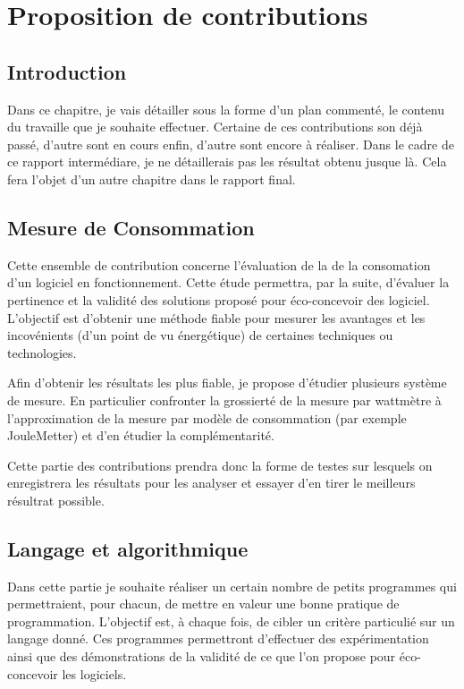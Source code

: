\documentclass[a4paper, 11pt]{report}
\begin{document}
\chapter{Proposition de contributions}
\section{Introduction}
Dans ce chapitre, je vais détailler sous la forme d'un plan commenté, le contenu du travaille que je souhaite effectuer. Certaine de ces contributions son déjà passé, d'autre sont en cours enfin, d'autre sont encore à réaliser. Dans le cadre de ce rapport intermédiare, je ne détaillerais pas les résultat obtenu jusque là. Cela fera l'objet d'un autre chapitre dans le rapport final.

\section{Mesure de Consommation}
Cette ensemble de contribution concerne l'évaluation de la de la consomation d'un logiciel en fonctionnement. Cette étude permettra, par la suite, d'évaluer la pertinence et la validité des solutions proposé pour éco-concevoir des logiciel. L'objectif est d'obtenir une méthode fiable pour mesurer les avantages et les incovénients (d'un point de vu énergétique) de certaines techniques ou technologies.

Afin d'obtenir les résultats les plus fiable, je propose d'étudier plusieurs système de mesure. En particulier confronter la grossierté de la mesure par wattmètre à l'approximation de la mesure par modèle de consommation (par exemple JouleMetter) et d'en étudier la complémentarité.

Cette partie des contributions prendra donc la forme de testes sur lesquels on enregistrera les résultats pour les analyser et essayer d'en tirer le meilleurs résultrat possible.

\section{Langage et algorithmique}
Dans cette partie je souhaite réaliser un certain nombre de petits programmes qui permettraient, pour chacun, de mettre en valeur une bonne pratique de programmation. L'objectif est, à chaque fois, de cibler un critère particulié sur un langage donné. Ces programmes permettront d'effectuer des expérimentation ainsi que des démonstrations de la validité de ce que l'on propose pour éco-concevoir les logiciels.
\end{document}
